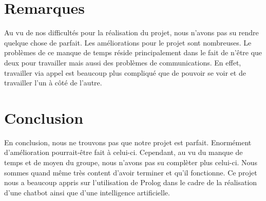 \documentclass{article}
\begin{document}
\section{Remarques}
Au vu de nos difficultés pour la réalisation du projet, nous n'avons pas su rendre quelque chose de parfait. Les améliorations pour le projet sont nombreuses. Le problèmes de ce manque de temps réside principalement dans le fait de n'être que deux pour travailler mais aussi des problèmes de communications. En effet, travailler via appel est beaucoup plus compliqué que de pouvoir se voir et de travailler l'un à côté de l'autre.
\pagebreak
\section{Conclusion}
En conclusion, nous ne trouvons pas que notre projet est parfait. Enormément d'amélioration pourrait-être fait à celui-ci. Cependant, au vu du manque de temps et de moyen du groupe, nous n'avons pas su complèter plus celui-ci. Nous sommes quand même très content d'avoir terminer et qu'il fonctionne.
Ce projet nous a beaucoup appris sur l'utilisation de Prolog dans le cadre de la réalisation d'une chatbot ainsi que d'une intelligence artificielle.
\end{document}
